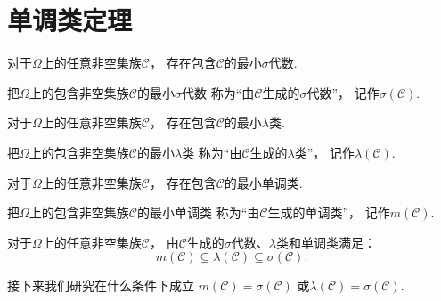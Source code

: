 \section{单调类定理}
\begin{proposition}
对于\(\Omega\)上的任意非空集族\(\mathcal{C}\)，
存在包含\(\mathcal{C}\)的最小\(\sigma\)代数.
\end{proposition}
\begin{definition}
把\(\Omega\)上的包含非空集族\(\mathcal{C}\)的最小\(\sigma\)代数
称为“由\(\mathcal{C}\)生成的\(\sigma\)代数”，
记作\(\sigma(\mathcal{C})\).
\end{definition}

\begin{proposition}
对于\(\Omega\)上的任意非空集族\(\mathcal{C}\)，
存在包含\(\mathcal{C}\)的最小\(\lambda\)类.
\end{proposition}
\begin{definition}
把\(\Omega\)上的包含非空集族\(\mathcal{C}\)的最小\(\lambda\)类
称为“由\(\mathcal{C}\)生成的\(\lambda\)类”，
记作\(\lambda(\mathcal{C})\).
\end{definition}

\begin{proposition}
对于\(\Omega\)上的任意非空集族\(\mathcal{C}\)，
存在包含\(\mathcal{C}\)的最小单调类.
\end{proposition}
\begin{definition}
把\(\Omega\)上的包含非空集族\(\mathcal{C}\)的最小单调类
称为“由\(\mathcal{C}\)生成的单调类”，
记作\(m(\mathcal{C})\).
\end{definition}

\begin{proposition}
对于\(\Omega\)上的任意非空集族\(\mathcal{C}\)，
由\(\mathcal{C}\)生成的\(\sigma\)代数、\(\lambda\)类和单调类满足：\begin{equation*}
	m(\mathcal{C})
	\subseteq \lambda(\mathcal{C})
	\subseteq \sigma(\mathcal{C}).
\end{equation*}
\end{proposition}

接下来我们研究在什么条件下成立
\(m(\mathcal{C}) = \sigma(\mathcal{C})\)
或\(\lambda(\mathcal{C}) = \sigma(\mathcal{C})\).

